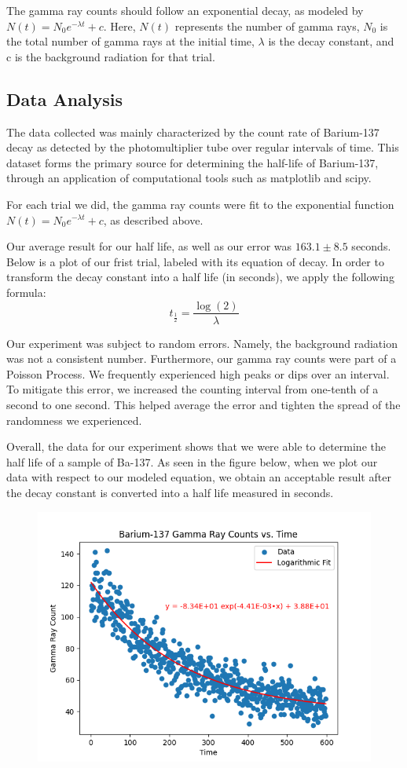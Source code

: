\documentclass[10pt,letterpaper,onecolumn]{article}
\begin{document}
The gamma ray counts should follow an exponential decay, as modeled by $N(t) = N_0e^{-\lambda t} + c$.
Here, $N(t)$ represents the number of gamma rays, $N_0$ is the total number of gamma rays at the
initial time, $\lambda$ is the decay constant, and c is the background radiation for that trial.




\subsection{Data Analysis}

The data collected was mainly characterized by the count rate of Barium-137 
decay as detected by the photomultiplier tube over regular intervals of time. 
This dataset forms the primary source for determining the half-life of 
Barium-137, through an application of computational tools such as matplotlib
and scipy.

For each trial we did, the gamma ray counts were fit to the exponential function 
$N(t) = N_0e^{-\lambda t} + c$, as described above.

Our average result for our half life, as well as our error was $163.1 \pm 8.5$ seconds.
Below is a plot of our frist trial, labeled with its equation of decay. In order to 
transform the decay constant into a half life (in seconds), we apply the following formula:
$$
t_{\frac{1}{2}} = \frac{\log(2)}{\lambda}
$$

Our experiment was subject to random errors. Namely, the background radiation was not
a consistent number. Furthermore, our gamma ray counts were part of a Poisson Process.
We frequently experienced high peaks or dips over an interval. To mitigate this error,
we increased the counting interval from one-tenth of a second to one second. This helped
average the error and tighten the spread of the randomness we experienced.

Overall, the data for our experiment shows that we were able to determine the 
half life of a sample of Ba-137. As seen in the figure below, when we plot our
data with respect to our modeled equation, we obtain an acceptable result after
the decay constant is converted into a half life measured in seconds. 
\begin{figure}[!htb]
  \centering
  \includegraphics[width=.9\textwidth]{../images/day3_liquidtrial3_plot.png}
\end{figure}
\end{document}
